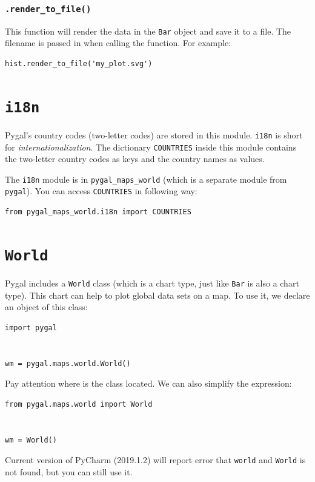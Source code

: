 \documentclass[12pt]{book}
\begin{document}
\subsubsection{\texttt{.render\_to\_file()}}
\label{sec:org3630ec7}
This function will render the data in the \texttt{Bar} object and save it to a file. The filename is passed in when calling the function. For example:
\begin{verbatim}
hist.render_to_file('my_plot.svg')
\end{verbatim}
\section{\texttt{i18n}}
\label{sec:org54b3f41}
Pygal's country codes (two-letter codes) are stored in this module. \texttt{i18n} is short for \emph{internationalization}. The dictionary \texttt{COUNTRIES} inside this module contains the two-letter country codes as keys and the country names as values.

The \texttt{i18n} module is in \texttt{pygal\_maps\_world} (which is a separate module from \texttt{pygal}). You can access \texttt{COUNTRIES} in following way:
\begin{verbatim}
from pygal_maps_world.i18n import COUNTRIES
\end{verbatim}
\section{\texttt{World}}
\label{sec:org3cfe58d}
Pygal includes a \texttt{World} class (which is a chart type, just like \texttt{Bar} is also a chart type). This chart can help to plot global data sets on a map. To use it, we declare an object of this class:
\begin{verbatim}
import pygal


wm = pygal.maps.world.World()
\end{verbatim}
Pay attention where is the class located. We can also simplify the expression:
\begin{verbatim}
from pygal.maps.world import World


wm = World()
\end{verbatim}
Current version of PyCharm (2019.1.2) will report error that \texttt{world} and \texttt{World} is not found, but you can still use it.
\end{document}
